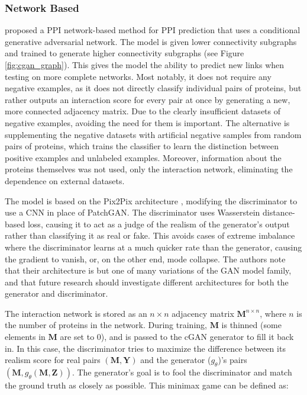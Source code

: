 \documentclass{article}
\begin{document}
\subsubsection{Network Based}
\citet{balogh_efficient_2022} proposed a PPI network-based method for PPI prediction that uses a conditional generative adversarial network. The model is given lower connectivity subgraphs and trained to generate higher connectivity subgraphs (see Figure \ref{fig:cgan_graph}). This gives the model the ability to predict new links when testing on more complete networks. Most notably, it does not require any negative examples, as it does not directly classify individual pairs of proteins, but rather outputs an interaction score for every pair at once by generating a new, more connected adjacency matrix. Due to the clearly insufficient datasets of negative examples, avoiding the need for them is important. The alternative is supplementing the negative datasets with artificial negative samples from random pairs of proteins, which trains the classifier to learn the distinction between positive examples and unlabeled examples. Moreover, information about the proteins themselves was not used, only the interaction network, eliminating the dependence on external datasets. 

The model is based on the Pix2Pix architecture \citep{Isola_2017_CVPR}, modifying the discriminator to use a CNN in place of PatchGAN. The discriminator uses Wasserstein distance-based loss, causing it to act as a judge of the realism of the generator's output rather than classifying it as real or fake. This avoids cases of extreme imbalance where the discriminator learns at a much quicker rate than the generator, causing the gradient to vanish, or, on the other end, mode collapse. The authors note that their architecture is but one of many variations of the GAN model family, and that future research should investigate different architectures for both the generator and discriminator.

The interaction network is stored as an \(n\times n\) adjacency matrix \(\mathbf{M}^{n\times n}\), where \(n\) is the number of proteins in the network. During training, \(\mathbf{M}\) is thinned (some elements in \(\mathbf{M}\) are set to 0), and is passed to the cGAN generator to fill it back in. In this case, the discriminator tries to maximize the difference between its realism score for real pairs \((\mathbf{M},\mathbf{Y})\) and the generator (\(g_\theta\))'s pairs \((\mathbf{M}, g_\theta(\mathbf{M}, \mathbf{Z}))\). The generator's goal is to fool the discriminator and match the ground truth as closely as possible. This minimax game can be defined as:
\end{document}
